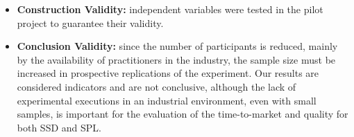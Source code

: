 \begin{itemize}

\item \textbf{Construction Validity:} independent variables were tested in the pilot project to guarantee their validity.

\item \textbf{Conclusion Validity:} since the number of participants is reduced, mainly by the availability of practitioners in the industry, the sample size must be increased in prospective replications of the experiment. Our results are considered indicators and are not conclusive, although the lack of experimental executions in an industrial environment, even with small samples, is important for the evaluation of the time-to-market and quality for both SSD and SPL.

\end{itemize}

